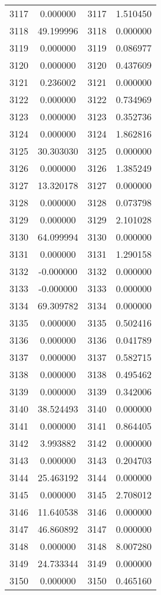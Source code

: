 \documentclass[12pt]{article}
\begin{document}
\begin{longtable}{@{}cccc@{}}
3117 & 0.000000 & 3117 & 1.510450 \\
3118 & 49.199996 & 3118 & 0.000000 \\
3119 & 0.000000 & 3119 & 0.086977 \\
3120 & 0.000000 & 3120 & 0.437609 \\
3121 & 0.236002 & 3121 & 0.000000 \\
3122 & 0.000000 & 3122 & 0.734969 \\
3123 & 0.000000 & 3123 & 0.352736 \\
3124 & 0.000000 & 3124 & 1.862816 \\
3125 & 30.303030 & 3125 & 0.000000 \\
3126 & 0.000000 & 3126 & 1.385249 \\
3127 & 13.320178 & 3127 & 0.000000 \\
3128 & 0.000000 & 3128 & 0.073798 \\
3129 & 0.000000 & 3129 & 2.101028 \\
3130 & 64.099994 & 3130 & 0.000000 \\
3131 & 0.000000 & 3131 & 1.290158 \\
3132 & -0.000000 & 3132 & 0.000000 \\
3133 & -0.000000 & 3133 & 0.000000 \\
3134 & 69.309782 & 3134 & 0.000000 \\
3135 & 0.000000 & 3135 & 0.502416 \\
3136 & 0.000000 & 3136 & 0.041789 \\
3137 & 0.000000 & 3137 & 0.582715 \\
3138 & 0.000000 & 3138 & 0.495462 \\
3139 & 0.000000 & 3139 & 0.342006 \\
3140 & 38.524493 & 3140 & 0.000000 \\
3141 & 0.000000 & 3141 & 0.864405 \\
3142 & 3.993882 & 3142 & 0.000000 \\
3143 & 0.000000 & 3143 & 0.204703 \\
3144 & 25.463192 & 3144 & 0.000000 \\
3145 & 0.000000 & 3145 & 2.708012 \\
3146 & 11.640538 & 3146 & 0.000000 \\
3147 & 46.860892 & 3147 & 0.000000 \\
3148 & 0.000000 & 3148 & 8.007280 \\
3149 & 24.733344 & 3149 & 0.000000 \\
3150 & 0.000000 & 3150 & 0.465160 \\

\end{longtable}
\end{document}

